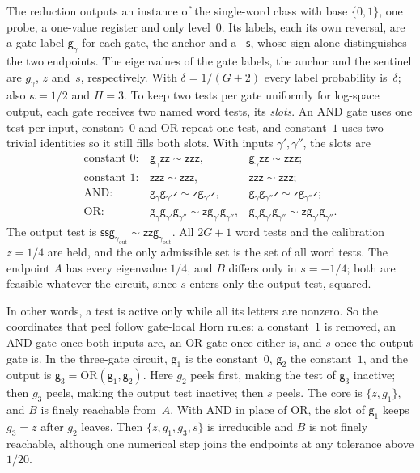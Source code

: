 The reduction outputs an instance of the single-word class with base
$\{0,1\}$, one probe, a one-value register and only level~$0$. Its labels,
each its own reversal, are a gate label $\mathsf g_\gamma$ for each gate,
the anchor and a ~$\mathsf s$, whose sign alone
distinguishes the two endpoints. The eigenvalues of the gate labels, the anchor and the sentinel are
$g_\gamma$, $z$ and~$s$, respectively. With $\delta=1/(G+2)$ every label
probability is~$\delta$; also $\kappa=1/2$ and $H=3$. To keep two tests per
gate uniformly for log-space output, each gate receives two named word tests,
its \emph{slots}. An AND gate uses one test per input, constant~$0$ and OR
repeat one test, and constant~$1$ uses two trivial identities so it still
fills both slots. With inputs $\gamma',\gamma''$, the slots are
\[
\begin{array}{lll}
\text{constant }0: & \mathsf g_\gamma\mathsf{zz}\sim\mathsf{zzz}, & \mathsf g_\gamma\mathsf{zz}\sim\mathsf{zzz};\\
\text{constant }1: & \mathsf{zzz}\sim\mathsf{zzz}, & \mathsf{zzz}\sim\mathsf{zzz};\\
\text{AND}: & \mathsf g_\gamma\mathsf g_{\gamma'}\mathsf z\sim\mathsf z\mathsf g_{\gamma'}\mathsf z, &
\mathsf g_\gamma\mathsf g_{\gamma''}\mathsf z\sim\mathsf z\mathsf g_{\gamma''}\mathsf z;\\
\text{OR}: & \mathsf g_\gamma\mathsf g_{\gamma'}\mathsf g_{\gamma''}\sim\mathsf z\mathsf g_{\gamma'}\mathsf g_{\gamma''}, &
\mathsf g_\gamma\mathsf g_{\gamma'}\mathsf g_{\gamma''}\sim\mathsf z\mathsf g_{\gamma'}\mathsf g_{\gamma''}.
\end{array}
\]
The output test is
$\mathsf{ss}\mathsf g_{\gamma_{\mathrm{out}}}\sim\mathsf{zz}\mathsf g_{\gamma_{\mathrm{out}}}$.
All $2G+1$ word tests and the calibration $z=1/4$ are held, and the only
admissible set is the set of all word tests. The endpoint $A$ has every
eigenvalue $1/4$, and $B$ differs only in $s=-1/4$; both are feasible
whatever the circuit, since $s$ enters only the output test, squared.

In other words, a test is active only while all its letters are nonzero.
So the coordinates that peel follow gate-local Horn rules: a constant~$1$
is removed, an AND gate once both inputs are, an OR gate once either is,
and $s$ once the output gate is. In the three-gate circuit, $\mathsf g_1$
is the constant~$0$, $\mathsf g_2$ the constant~$1$, and the output is
$\mathsf g_3=\mathrm{OR}(\mathsf g_1,\mathsf g_2)$. Here $g_2$ peels first,
making the test of $\mathsf g_3$ inactive; then $g_3$ peels, making the
output test inactive; then $s$ peels. The core is $\{z,g_1\}$, and
$B$ is finely reachable from~$A$. With AND in place of OR, the slot of
$\mathsf g_1$ keeps $g_3=z$ after $g_2$ leaves. Then $\{z,g_1,g_3,s\}$ is
irreducible and $B$ is not finely reachable, although one numerical step
joins the endpoints at any tolerance above $1/20$.

